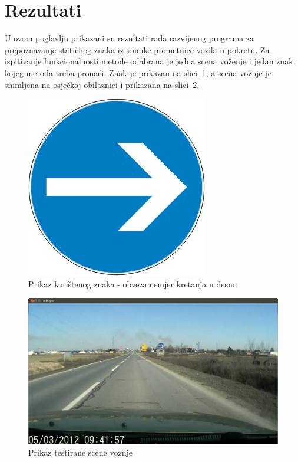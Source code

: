 \newpage
\setcounter{figure}{0}

\section{Rezultati} %
\label{sec:Rezultati}

U ovom poglavlju prikazani su rezultati rada razvijenog programa za
prepoznavanje statičnog znaka iz snimke prometnice vozila u pokretu.  Za
ispitivanje funkcionalnosti metode odabrana je jedna scena voženje i
jedan znak kojeg metoda treba pronaći. Znak je prikazan na
slici~\ref{fig:znak}, a scena vožnje je snimljena na osječkoj
obilaznici i prikazana na slici~\ref{fig:scena.png}.

\begin{figure}[h]
\centering
\includegraphics[scale=0.5]{figures/znak.png}
\caption{Prikaz korištenog znaka - obvezan smjer kretanja u desno}
\label{fig:znak}
\end{figure}

\begin{figure}[h]
\centering
\includegraphics[scale=0.3]{figures/scena.png}
\caption{Prikaz testirane scene voznje}
\label{fig:scena.png}
\end{figure}

